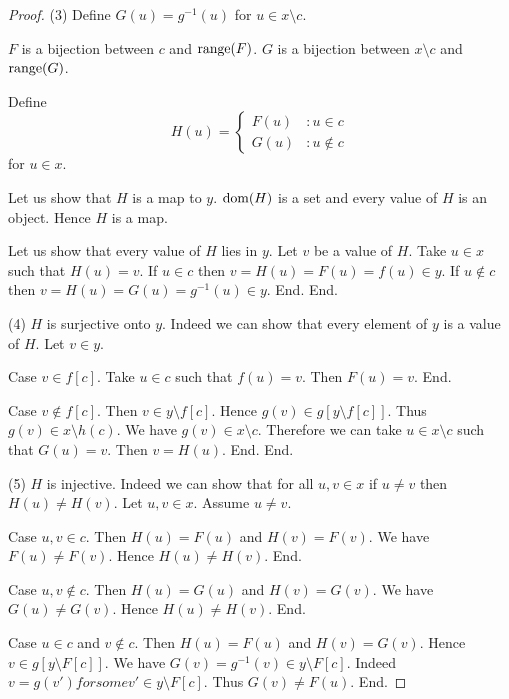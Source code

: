 \documentclass{article}
\begin{document}
\begin{forthel}
\begin{proof}
        (3) Define $G(u) = g^{-1}(u)$ for $u \in x \setminus c$.

        $F$ is a bijection between $c$ and $\textrm{range}(F)$.
        $G$ is a bijection between $x \setminus c$ and $\textrm{range}(G)$.

        Define \[ H(u) =
          \begin{cases}
            F(u) & : u \in c \\
            G(u) & : u \notin c
          \end{cases} \]
        for $u \in x$.

        Let us show that $H$ is a map to $y$.
          $\operatorname{dom}(H)$ is a set and every value of $H$ is an object.
          Hence $H$ is a map.

          Let us show that every value of $H$ lies in $y$.
            Let $v$ be a value of $H$.
            Take $u \in x$ such that $H(u) = v$.
            If $u \in c$ then $v = H(u) = F(u) = f(u) \in y$.
            If $u \notin c$ then $v = H(u) = G(u) = g^{-1}(u) \in y$.
          End.
        End.

        (4) $H$ is surjective onto $y$.
        Indeed we can show that every element of $y$ is a value of $H$.
          Let $v \in y$.

          Case $v \in f[c]$.
            Take $u \in c$ such that $f(u) = v$.
            Then $F(u) = v$.
          End.

          Case $v \notin f[c]$.
            Then $v \in y \setminus f[c]$.
            Hence $g(v) \in g[y \setminus f[c]]$.
            Thus $g(v) \in x \setminus h(c)$.
            We have $g(v) \in x \setminus c$.
            Therefore we can take $u \in x \setminus c$ such that $G(u) = v$.
            Then $v = H(u)$.
          End.
        End.

        (5) $H$ is injective.
        Indeed we can show that for all $u, v \in x$ if $u \neq v$ then $H(u) \neq H(v)$.
          Let $u,v \in x$.
          Assume $u \neq v$.

          Case $u,v \in c$.
            Then $H(u) = F(u)$ and $H(v) = F(v)$.
            We have $F(u) \neq F(v)$.
            Hence $H(u) \neq H(v)$.
          End.

          Case $u,v \notin c$.
            Then $H(u) = G(u)$ and $H(v) = G(v)$.
            We have $G(u) \neq G(v)$.
            Hence $H(u) \neq H(v)$.
          End.

          Case $u \in c$ and $v \notin c$.
            Then $H(u) = F(u)$ and $H(v) = G(v)$.
            Hence $v \in g[y \setminus F[c]]$.
            We have $G(v) = g^{-1}(v) \in y \setminus F[c]$.
            Indeed $v = g(v') for some v' \in y \setminus F[c]$.
            Thus $G(v) \neq F(u)$.
          End.


\end{proof}
\end{forthel}
\end{document}
